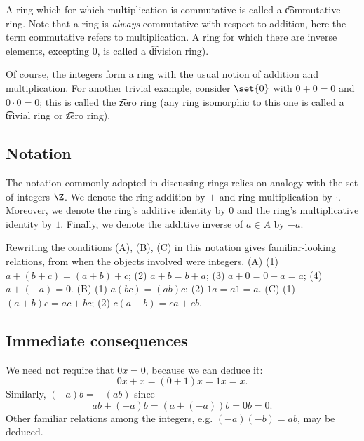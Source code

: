 A ring which for which multiplication is commutative is called a \t{commutative ring}.
Note that a ring is \textit{always} commutative with respect to addition, here the term commutative refers to multiplication.
A ring for which there are inverse elements, excepting 0, is called a \t{division ring}).

Of course, the integers form a ring with the usual notion of addition and multiplication.
For another trivial example, consider $\set{0}$ with $0+0 = 0$ and $0\cdot 0 = 0$; this is called the \t{zero ring} (any ring isomorphic to this one is called a \t{trivial ring} or \t{zero ring}).


\subsection*{Notation}

The notation commonly adopted in discussing rings relies on analogy with the set of integers $\Z $.
We denote the ring addition by $+$ and ring multiplication by $\cdot $.
Moreover, we denote the ring's additive identity by $0$ and the ring's multiplicative identity by $1$.
Finally, we denote the additive inverse of $a \in A$ by $-a$.

Rewriting the conditions (A), (B), (C) in this notation gives familiar-looking relations, from when the objects involved were integers.
(A) (1) $a+(b + c) = (a+b)+c$; (2) $a+b = b+a$; (3) $a + 0 = 0 + a = a$; (4) $a + (-a) = 0$.
(B) (1) $a(bc) = (ab)c$; (2) $1a = a1 = a$.
(C) (1) $(a+b)c = ac + bc$; (2) $c(a+b) = ca + cb$.

\subsection*{Immediate consequences}

We need not require that $0x = 0$, because we can deduce it:
\[
0x + x = (0 + 1)x = 1x = x.
\]
Similarly, $(-a)b = -(ab)$ since
\[
ab + (-a)b = (a + (-a))b = 0b = 0.
\]
Other familiar relations among the integers, e.g. $(-a)(-b) = ab$, may be deduced.

